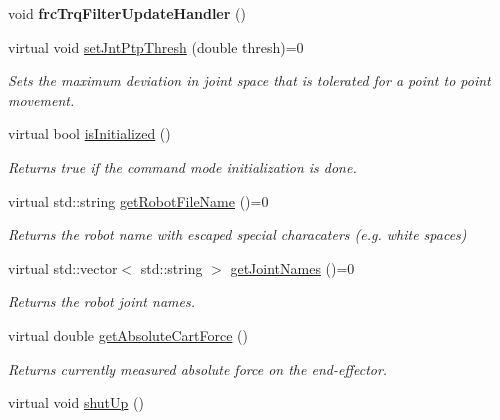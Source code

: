 \begin{DoxyCompactItemize}
\item 
void {\bfseries frc\+Trq\+Filter\+Update\+Handler} ()\hypertarget{classkukadu_1_1ControlQueue_aea0b90d04380aab043194e964231690a}{}\label{classkukadu_1_1ControlQueue_aea0b90d04380aab043194e964231690a}

\item 
virtual void \hyperlink{classkukadu_1_1ControlQueue_a5af587fff906cf978225a317e701d41f}{set\+Jnt\+Ptp\+Thresh} (double thresh)=0
\begin{DoxyCompactList}\small\item\em Sets the maximum deviation in joint space that is tolerated for a point to point movement. \end{DoxyCompactList}\item 
virtual bool \hyperlink{classkukadu_1_1ControlQueue_ac6e06776a9e03107aabc111ef5ce2b6d}{is\+Initialized} ()
\begin{DoxyCompactList}\small\item\em Returns true if the command mode initialization is done. \end{DoxyCompactList}\item 
virtual std\+::string \hyperlink{classkukadu_1_1ControlQueue_aab7dbf0d07b829b9612cfe7141c801a1}{get\+Robot\+File\+Name} ()=0
\begin{DoxyCompactList}\small\item\em Returns the robot name with escaped special characaters (e.\+g. white spaces) \end{DoxyCompactList}\item 
virtual std\+::vector$<$ std\+::string $>$ \hyperlink{classkukadu_1_1ControlQueue_a85702573cb64f7f3dd9c3d2eac95a6ea}{get\+Joint\+Names} ()=0
\begin{DoxyCompactList}\small\item\em Returns the robot joint names. \end{DoxyCompactList}\item 
virtual double \hyperlink{classkukadu_1_1ControlQueue_a550f23320f1b124b1cd587605317e37c}{get\+Absolute\+Cart\+Force} ()
\begin{DoxyCompactList}\small\item\em Returns currently measured absolute force on the end-\/effector. \end{DoxyCompactList}\item 
virtual void \hyperlink{classkukadu_1_1ControlQueue_a8e76e19772053274046193436b0cae1c}{shut\+Up} ()\hypertarget{classkukadu_1_1ControlQueue_a8e76e19772053274046193436b0cae1c}{}\label{classkukadu_1_1ControlQueue_a8e76e19772053274046193436b0cae1c}


\end{DoxyCompactItemize}
